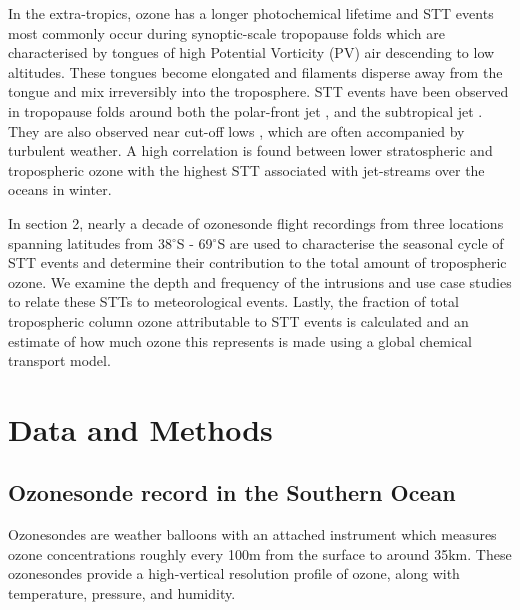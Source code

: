 \documentclass{article}
\begin{document}
    In the extra-tropics, ozone has a longer photochemical lifetime and STT events most commonly occur during synoptic-scale tropopause folds \citep{Sprenger2003, Tang2012} which are characterised by tongues of high Potential Vorticity (PV) air descending to low altitudes. These tongues become elongated and filaments disperse away from the tongue and mix irreversibly into the troposphere. STT events have been observed in tropopause folds around both the polar-front jet \citep{Vaughan1994, Beekmann1997}, and the subtropical jet \citep{Baray2000}. They are also observed near cut-off lows \citep{Price1993, Wirth1995}, which are often accompanied by turbulent weather. A high correlation is found between lower stratospheric and tropospheric ozone \citep{Terao2008} with the highest STT associated with jet-streams over the oceans in winter.
  


    In section 2, nearly a decade of ozonesonde flight recordings from three locations spanning latitudes from 38$^{\circ}$S - 69$^{\circ}$S are used to characterise the seasonal cycle of STT events and determine their contribution to the total amount of tropospheric ozone.
    We examine the depth and frequency of the intrusions and use case studies to relate these STTs to meteorological events.
    Lastly, the fraction of total tropospheric column ozone attributable to STT events is calculated and an estimate of how much ozone this represents is made using a global chemical transport model.

\section{Data and Methods}

  \subsection{Ozonesonde record in the Southern Ocean}
    Ozonesondes are weather balloons with an attached instrument which measures ozone concentrations roughly every 100m from the surface to around 35km.
    These ozonesondes provide a high-vertical resolution profile of ozone, along with temperature, pressure, and humidity.
    
\end{document}
